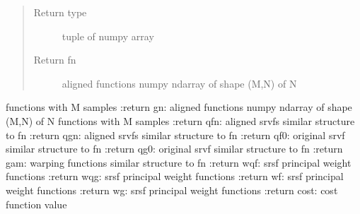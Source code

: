 \documentclass[letterpaper,10pt,english]{sphinxmanual}
\begin{document}
\begin{fulllineitems}
\begin{quote}
\begin{description}
\item[{Return type}] \leavevmode
tuple of numpy array

\item[{Return fn}] \leavevmode
aligned functions \sphinxhyphen{} numpy ndarray of shape (M,N) of N

\end{description}\end{quote}

functions with M samples
:return gn: aligned functions \sphinxhyphen{} numpy ndarray of shape (M,N) of N
functions with M samples
:return qfn: aligned srvfs \sphinxhyphen{} similar structure to fn
:return qgn: aligned srvfs \sphinxhyphen{} similar structure to fn
:return qf0: original srvf \sphinxhyphen{} similar structure to fn
:return qg0: original srvf \sphinxhyphen{} similar structure to fn
:return gam: warping functions \sphinxhyphen{} similar structure to fn
:return wqf: srsf principal weight functions
:return wqg: srsf principal weight functions
:return wf: srsf principal weight functions
:return wg: srsf principal weight functions
:return cost: cost function value

\end{fulllineitems}

\end{document}
